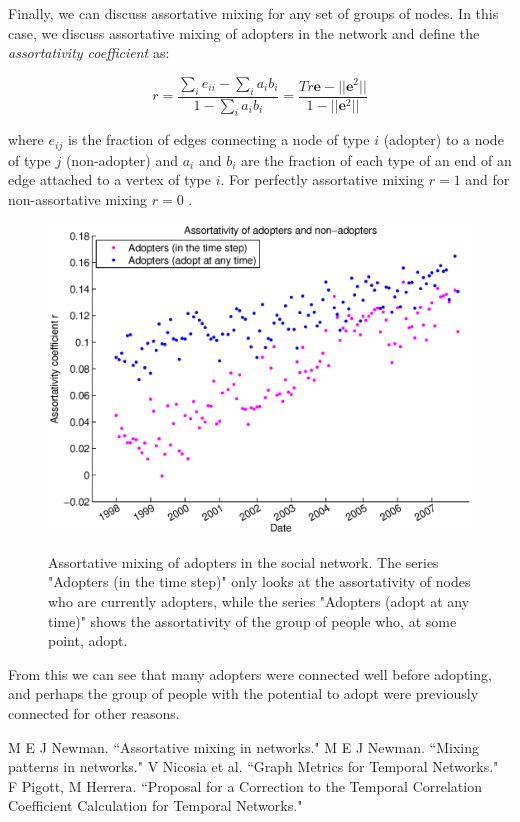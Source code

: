 \documentclass[12pt]{article}
\begin{document}
Finally, we can discuss assortative mixing for any set of groups of nodes. In this case, we discuss assortative mixing of adopters in the network and define the \emph{assortativity coefficient} as:

\begin{equation}
r = \frac{\sum_i e_{ii} - \sum_i a_i b_i}{1 - \sum_i a_i b_i} = \frac{Tr \mathbf{e} - || \mathbf{e}^2||}{1 - || \mathbf{e}^2||}
\end{equation}

where \(e_{ij}\) is the fraction of edges connecting a node of type \(i\) (adopter) to a node of type \(j\) (non-adopter) and \(a_i\) and \(b_i\) are the fraction of each type of an end of an edge attached to a vertex of type \(i\). For perfectly assortative mixing \(r = 1\) and for non-assortative mixing \(r = 0\) \cite{1}.

\begin{figure}[H]
\includegraphics[trim = 0cm 0cm 0cm 0cm, width = .9\textwidth]{Graficos/adoptAssort.eps}
\label{fig:adoptAssort}
\caption{Assortative mixing of adopters in the social network. The series "Adopters (in the time step)" only looks at the assortativity of nodes who are currently adopters, while the series "Adopters (adopt at any time)" shows the assortativity of the group of people who, at some point, adopt. }
\end{figure}

From this we can see that many adopters were connected well before adopting, and perhaps the group of people with the potential to adopt were previously connected for other reasons.


%
%

\begin{thebibliography}{99}
 M E J Newman. ``Assortative mixing in networks." 
 M E J Newman. ``Mixing patterns in networks."
 V Nicosia et al. ``Graph Metrics for Temporal Networks." 
 F Pigott, M Herrera. ``Proposal for a Correction to the Temporal Correlation Coefficient Calculation for Temporal Networks."
\end{thebibliography}
\end{document}
